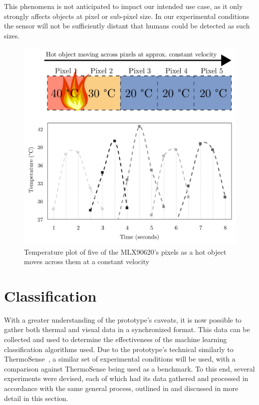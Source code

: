 \documentclass[../thesis/thesis.tex]{subfiles}
\begin{document}
This phenomena is not anticipated to impact our intended use case, as it only strongly affects objects at pixel or sub-pixel size. In our experimental conditions the sensor will not be sufficiently distant that humans could be detected as such sizes.

\begin{figure}
\centering
\includegraphics[width=\textwidth]{../diagrams/03_hot_water_top_row_modified2.pdf}
\caption{Temperature plot of five of the MLX90620's pixels as a hot object moves across them at a constant velocity}
\label{fig:hotmotion}
\end{figure}

\section{Classification}
With a greater understanding of the prototype's caveats, it is now possible to gather both thermal and visual data in a synchronized format. This data can be collected and used to determine the effectiveness of the machine learning classification algorithms used. Due to the prototype's technical similarly to ThermoSense~\cite{beltran2013thermosense}, a similar set of experimental conditions will be used, with a comparison against ThermoSense being used as a benchmark. To this end, several experiments were devised, each of which had its data gathered and processed in accordance with the same general process, outlined in  and discussed in more detail in this section.
\end{document}
